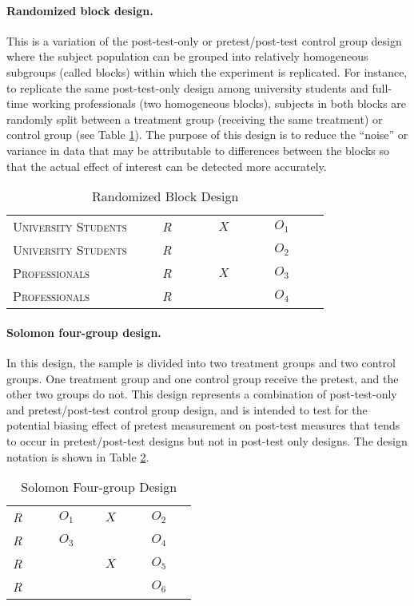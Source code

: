 \paragraph{Randomized block design.} This is a variation of the post-test-only or pretest/post-test control group design where the subject population can be grouped into relatively homogeneous subgroups (called blocks) within which the experiment is replicated. For instance, to replicate the same post-test-only design among university students and full-time working professionals (two homogeneous blocks), subjects in both blocks are randomly split between a treatment group (receiving the same treatment) or control group (see Table \ref{09:tab05}). The purpose of this design is to reduce the ``noise'' or variance in data that may be attributable to differences between the blocks so that the actual effect of interest can be detected more accurately.

\begin{table}[H]
	\centering
	\begin{tabularx}{0.90\linewidth}{p{0.40\linewidth}p{0.15\linewidth}p{0.15\linewidth}p{0.15\linewidth}}
		\toprule
		\textsc{University Students} & \textit{R} & $ X $ & $ O_1 $ \\
		\textsc{University Students} & \textit{R} &       & $ O_2 $ \\
		\textsc{Professionals} & \textit{R} & $ X $ & $ O_3 $ \\
		\textsc{Professionals} & \textit{R} &       & $ O_4 $ \\
		\bottomrule
	\end{tabularx}
	\caption{Randomized Block Design}
	\label{09:tab05}
\end{table}

\paragraph{Solomon four-group design.} In this design, the sample is divided into two treatment groups and two control groups. One treatment group and one control group receive the pretest, and the other two groups do not. This design represents a combination of post-test-only and pretest/post-test control group design, and is intended to test for the potential biasing effect of pretest measurement on post-test measures that tends to occur in pretest/post-test designs but not in post-test only designs. The design notation is shown in Table \ref{09:tab06}.

\begin{table}[H]
	\centering
	\begin{tabularx}{0.65\linewidth}{p{0.15\linewidth}p{0.15\linewidth}p{0.15\linewidth}p{0.15\linewidth}}
		\toprule
		\textit{R} & $ O_1 $ & $ X $ & $ O_2 $ \\
		\textit{R} & $ O_3 $ &       & $ O_4 $ \\
		\textit{R} &         & $ X $ & $ O_5 $ \\
		\textit{R} &         &       & $ O_6 $ \\
		\bottomrule
	\end{tabularx}
	\caption{Solomon Four-group Design}
	\label{09:tab06}
\end{table}

